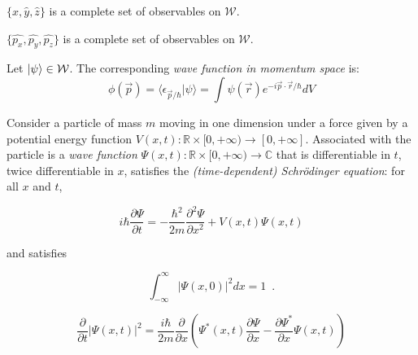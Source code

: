 \begin{prop}
$\{ \hat{x}, \hat{y}, \hat{z}\}$ is a complete set of observables on $\mathcal{W}$.
\end{prop}

\begin{prop}
$\{ \hat{p_x}, \hat{p_y}, \hat{p_z}\}$ is a complete set of observables on $\mathcal{W}$.
\end{prop}

\begin{df}
Let $\left| {\psi} \right\rangle \in \mathcal{W}$. The corresponding \emph{wave function in momentum space} is:
\[ \phi(\vec{p}) = \langle \epsilon_{\vec{p} / \hbar} | \psi \rangle = \int \psi(\vec{r}) e^{-i \vec{p} \cdot \vec{r} / \hbar} dV \]
\end{df}

Consider a particle of mass $m$ moving in one dimension under a force given by a potential energy function $V(x,t) : \mathbb{R} \times [0,+\infty) \rightarrow [0, + \infty]$. Associated with the particle is a \emph{wave function} $\Psi(x,t) : \mathbb{R} \times [0,+\infty) \rightarrow \mathbb{C}$ that is differentiable in $t$, twice differentiable in $x$, satisfies the \emph{(time-dependent) Schr\"{o}dinger equation}: for all $x$ and $t$,

\[ i \hbar \frac{\partial \Psi}{\partial t} = - \frac{\hbar^2}{2 m} \frac{\partial^2 \Psi}{\partial x^2} + V(x,t) \Psi(x,t) \]

and satisfies

\[ \int_{- \infty}^\infty |\Psi(x,0)|^2 dx = 1 \enspace . \]

\begin{prop}
\label{prop:differentiate_psi_squared}
\[ \frac{\partial}{\partial t} |\Psi(x,t)|^2 = \frac{i \hbar}{2m} \frac{\partial}{\partial x} \left(
\Psi^*(x,t) \frac{\partial \Psi}{\partial x} - \frac{\partial \Psi^*}{\partial x} \Psi(x,t) \right) \]
\end{prop}


